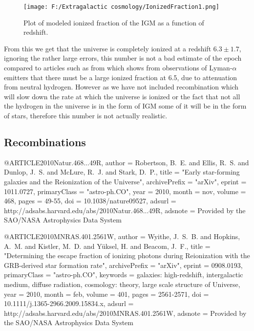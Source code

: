 \documentclass{article}
\begin{document}
\begin{figure}
	\centering
		\texttt{[image: F:/Extragalactic cosmology/IonizedFraction1.png]}
		\caption{Plot of modeled ionized fraction of the IGM as a function of redshift.} 
	\label{fig:IonizedFraction1}
\end{figure}

From this we get that the universe is completely ionized at a redshift $6.3\pm1.7$, ignoring the rather large errors, this number is not a bad estimate of the epoch compared to articles such as from \cite{Ota:arXiv0707.1561} which shows from observations of Lyman-$\alpha$ emitters that there must be a large ionized fraction at 6.5, due to attenuation from neutral hydrogen. However as we have not included recombination which will slow down the rate at which the universe is ionized or the fact that not all the hydrogen in the universe is in the form of IGM some of it will be in the form of stars, therefore this number is not actually realistic.\\

\subsection{Recombinations}


@ARTICLE{2010Natur.468...49R,
   author = {{Robertson}, B.~E. and {Ellis}, R.~S. and {Dunlop}, J.~S. and 
	{McLure}, R.~J. and {Stark}, D.~P.},
    title = "{Early star-forming galaxies and the Reionization of the Universe}",
archivePrefix = "arXiv",
   eprint = {1011.0727},
 primaryClass = "astro-ph.CO",
     year = 2010,
    month = nov,
   volume = 468,
    pages = {49-55},
      doi = {10.1038/nature09527},
   adsurl = {http://adsabs.harvard.edu/abs/2010Natur.468...49R},
  adsnote = {Provided by the SAO/NASA Astrophysics Data System}
}

@ARTICLE{2010MNRAS.401.2561W,
   author = {{Wyithe}, J.~S.~B. and {Hopkins}, A.~M. and {Kistler}, M.~D. and 
	{Y{\"u}ksel}, H. and {Beacom}, J.~F.},
    title = "{Determining the escape fraction of ionizing photons during Reionization with the GRB-derived star formation rate}",
archivePrefix = "arXiv",
   eprint = {0908.0193},
 primaryClass = "astro-ph.CO",
 keywords = {galaxies: high-redshift, intergalactic medium, diffuse radiation, cosmology: theory, large scale structure of Universe},
     year = 2010,
    month = feb,
   volume = 401,
    pages = {2561-2571},
      doi = {10.1111/j.1365-2966.2009.15834.x},
   adsurl = {http://adsabs.harvard.edu/abs/2010MNRAS.401.2561W},
  adsnote = {Provided by the SAO/NASA Astrophysics Data System}
}
	
\end{document}
